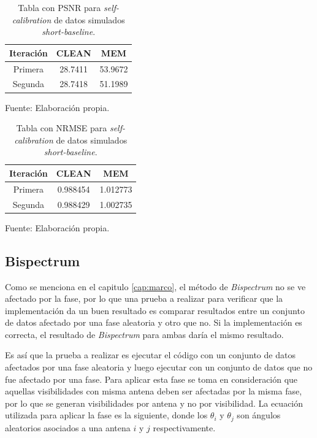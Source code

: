 \begin{table}[!ht]
	\begin{center}
		\caption{Tabla con PSNR para \textit{self-calibration} de datos simulados \textit{short-baseline}.}
		\begin{tabular}{| c | c | c |}
			\hline
			Iteración & CLEAN & MEM\\ \hline
			Primera & 28.7411 & 53.9672\\ \hline
            Segunda & 28.7418 & 51.1989\\ \hline
		\end{tabular}
		\label{tab:sim_short_selfcal_psnr}
	\end{center}
	\begin{center}
		Fuente: Elaboración propia.
	\end{center}
\end{table}


\begin{table}[!ht]
	\begin{center}
		\caption{Tabla con NRMSE para \textit{self-calibration} de datos simulados \textit{short-baseline}.}
		\begin{tabular}{| c | c | c |}
			\hline
			Iteración & CLEAN & MEM\\ \hline
			Primera & 0.988454 & 1.012773\\ \hline
            Segunda & 0.988429 & 1.002735\\ \hline
		\end{tabular}
		\label{tab:sim_short_selfcal_nrmse}
	\end{center}
	\begin{center}
		Fuente: Elaboración propia.
	\end{center}
\end{table}

\subsection{Bispectrum}

Como se menciona en el capitulo \ref{cap:marco}, el método de \textit{Bispectrum} no se ve afectado por la fase, por lo que una prueba a realizar para verificar que la implementación da un buen resultado es comparar resultados entre un conjunto de datos afectado por una fase aleatoria y otro que no. Si la implementación es correcta, el resultado de \textit{Bispectrum} para ambas daría el mismo resultado.

Es así que la prueba a realizar es ejecutar el código con un conjunto de datos afectados por una fase aleatoria y luego ejecutar con un conjunto de datos que no fue afectado por una fase. Para aplicar esta fase se toma en consideración que aquellas visibilidades con misma antena deben ser afectadas por la misma fase, por lo que se generan visibilidades por antena y no por visibilidad. La ecuación utilizada para aplicar la fase es la siguiente, donde los $\theta_{i}$ y $\theta_{j}$ son ángulos aleatorios asociados a una antena $i$ y $j$ respectivamente. 

